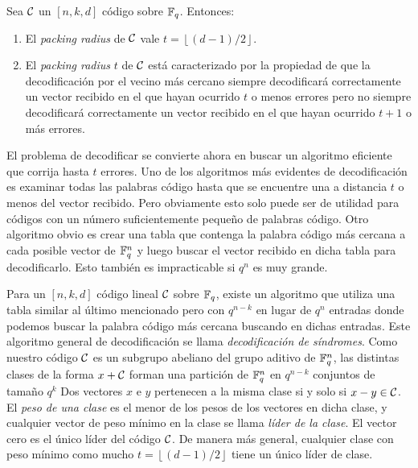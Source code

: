 \begin{theorem}
Sea \(\mathcal{C}\) un \([n,k,d]\) código sobre \(\mathbb{F}_q\). Entonces:
\begin{enumerate}
    \item El \textit{packing radius} de \(\mathcal{C}\) vale \(t = \left\lfloor (d-1) / 2 \right\rfloor\).
    \item El \textit{packing radius} \(t\) de \(\mathcal{C}\) está caracterizado por la propiedad de que la decodificación por el vecino más cercano siempre decodificará correctamente un vector recibido en el que hayan ocurrido \(t\) o menos errores pero no siempre decodificará correctamente un vector recibido en el que hayan ocurrido \(t+1\) o más errores.
\end{enumerate}
\end{theorem}

El problema de decodificar se convierte ahora en buscar un algoritmo eficiente que corrija hasta \(t\) errores. Uno de los algoritmos más evidentes de decodificación es examinar todas las palabras código hasta que se encuentre una a distancia \(t\) o menos del vector recibido. Pero obviamente esto solo puede ser de utilidad para códigos con un número suficientemente pequeño de palabras código. Otro algoritmo obvio es crear una tabla que contenga la palabra código más cercana a cada posible vector de \(\mathbb{F}_q^{n}\) y luego buscar el vector recibido en dicha tabla para decodificarlo. Esto también es impracticable si \(q^{n}\) es muy grande.

Para un \([n, k, d]\) código lineal \(\mathcal{C}\) sobre \(\mathbb{F}_q\), existe un algoritmo que utiliza una tabla similar al último mencionado pero con \(q^{n-k}\) en lugar de \(q^{n}\) entradas donde podemos buscar la palabra código más cercana buscando en dichas entradas. Este algoritmo general de decodificación se llama \textit{decodificación de síndromes}. Como nuestro código \(\mathcal{C}\) es un subgrupo abeliano del grupo aditivo de  \(\mathbb{F}_q^{n}\), las distintas clases de la forma \(x + \mathcal{C}\) forman una partición de \(\mathbb{F}_q^{n}\) en \(q^{n-k}\) conjuntos de tamaño \(q^{k}\) %
Dos vectores \(x\) e \(y\) pertenecen a la misma clase si y solo si \(x - y \in \mathcal{C}\). El \textit{peso de una clase} es el menor de los pesos de los vectores en dicha clase, y cualquier vector de peso mínimo en la clase se llama \textit{líder de la clase}. El vector cero es el único líder del código \(\mathcal{C}\). De manera más general, cualquier clase con peso mínimo como mucho \(t = \left\lfloor (d-1) / 2 \right\rfloor\) tiene un único líder de clase.

